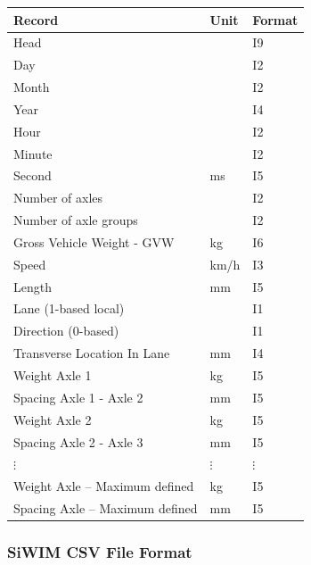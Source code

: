 \documentclass[
]{article}
\begin{document}
\begin{longtable}[]{@{}
  >{\raggedright\arraybackslash}p{}
  >{\centering\arraybackslash}p{}
  >{\centering\arraybackslash}p{}@{}}
\toprule\noalign{}
\begin{minipage}[b]{\linewidth}\centering
\textbf{Record}
\end{minipage} & \begin{minipage}[b]{\linewidth}\centering
\textbf{Unit}
\end{minipage} & \begin{minipage}[b]{\linewidth}\centering
\textbf{Format}
\end{minipage} \\
\midrule\noalign{}
\endhead
\bottomrule\noalign{}
\endlastfoot
Head & & I9 \\
Day & & I2 \\
Month & & I2 \\
Year & & I4 \\
Hour & & I2 \\
Minute & & I2 \\
Second & ms & I5 \\
Number of axles & & I2 \\
Number of axle groups & & I2 \\
Gross Vehicle Weight - GVW & kg & I6 \\
Speed & km/h & I3 \\
Length & mm & I5 \\
Lane (1-based local) & & I1 \\
Direction (0-based) & & I1 \\
Transverse Location In Lane & mm & I4 \\
Weight Axle 1 & kg & I5 \\
Spacing Axle 1 - Axle 2 & mm & I5 \\
Weight Axle 2 & kg & I5 \\
Spacing Axle 2 - Axle 3 & mm & I5 \\
$\vdots$
&
$\vdots$
&
$\vdots$ \\
Weight Axle -- Maximum defined & kg & I5 \\
Spacing Axle -- Maximum defined & mm & I5 \\
\end{longtable}

\subsubsection*{\texorpdfstring{SiWIM CSV File Format
}{SiWIM CSV File Format }}\label{siwim-csv-file-format}
\end{document}
